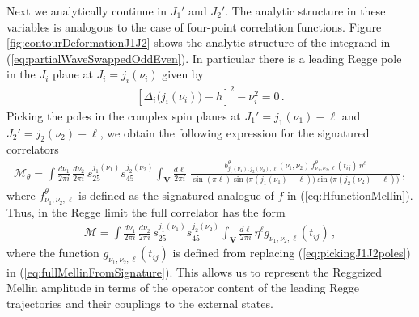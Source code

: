 Next we analytically continue in $ J_1'$ and $J_2' $.
The analytic structure in these variables is analogous to the case of four-point correlation functions.
Figure \ref{fig:contourDeformationJ1J2} shows the analytic structure of the integrand in (\ref{eq:partialWaveSwappedOddEven}).
In particular there is a leading Regge pole in the $ J_i $ plane at $ J_i =j_i( \nu_i ) $ given by
\begin{align}
  \left[ \Delta_i\big(j_i( \nu_i )\big)- h \right]^{2}  -\nu_i^{2}  = 0\,.
\end{align}
Picking the poles in the complex spin planes at $J_1'= j_1(\nu_1)-\ell$ and $J_2'= j_2(\nu_2)-\ell$,  we obtain
the following expression for the signatured correlators
\begin{align}
  \mathcal{M}_{\theta}
  =
  \int
  \frac{d \nu_1}{2\pi i}\,
  \frac{d \nu_2}{2\pi i}
  \, s_{25}^{j_1( \nu_1)} s_{45}^{j_2( \nu_2)}
  \int_{\mathbf{V}} \frac{d \ell}{2\pi i}\,
  \,
  \frac{
    b_{j_1(\nu_1),j_2(\nu_2),\ell}^{\theta}(\nu_1,\nu_2) \,
    f_{\nu_1,\nu_2,\ell}^{\theta}(t_{ij})\, \eta^{\ell}
  }{\sin(\pi \ell) \sin\!\big(\pi (j_1(\nu_1)-\ell)\big) \sin\!\big(\pi (j_2(\nu_2)-\ell)   \big)}
  \,,\label{eq:pickingJ1J2poles}
\end{align}
where $ f_{\nu_1,\nu_2,\ell}^{\theta} $ is defined as the signatured analogue of $ f $ in (\ref{eq:HfunctionMellin}).
Thus, in the Regge limit the full correlator has the form
\begin{align}
  \mathcal{M}
  =
  \int
  \frac{d \nu_1}{2\pi i}\,
  \frac{d \nu_2}{2\pi i}
  \, s_{25}^{j_1\left( \nu_1 \right)} s_{45}^{j_2\left( \nu_2 \right)}
  \int_{\mathbf{V}} \frac{d \ell}{2\pi i}\, \eta^{\ell}  g_{\nu_1,\nu_2,\ell}(t_{ij})
  \,,\label{eq:final}
\end{align}
where the function $g_{\nu_1,\nu_2,\ell} (t_{ij})$ is defined from replacing (\ref{eq:pickingJ1J2poles}) in (\ref{eq:fullMellinFromSignature}).
This allows us to represent the Reggeized Mellin amplitude in terms of the operator content of the leading Regge trajectories and their couplings to the external states.

